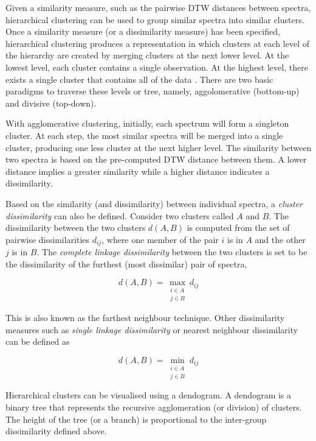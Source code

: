 Given a similarity measure, such as the pairwise DTW distances between spectra, hierarchical clustering can be used to group similar spectra into similar clusters. Once a similarity measure (or a dissimilarity measure) has been specified, hierarchical clustering produces a representation in which clusters at each level of the hierarchy are created by merging clusters at the next lower level. At the lowest level, each cluster contains a single observation. At the highest level, there exists a single cluster that contains all of the data \cite{hastie2009elements}. There are two basic paradigms to traverse these levels or tree, namely, aggolomerative (bottom-up) and divisive (top-down). 

With agglomerative clustering, initially, each spectrum will form a singleton cluster. At each step, the most similar spectra will be merged into a single cluster, producing one less cluster at the next higher level. The similarity between two spectra is based on the pre-computed DTW distance between them. A lower distance implies a greater similarity while a higher distance indicates a dissimilarity.  

Based on the similarity (and dissimilarity) between individual spectra, a \emph{cluster dissimilarity} can also be defined. Consider two clusters called $A$ and $B$. The dissimilarity between the two clusters $d(A,B)$ is computed from the set of pairwise dissimilarities $d_{ij}$, where one member of the pair $i$ is in $A$ and the other $j$ is in $B$. The \emph{complete linkage dissimilarity} between the two clusters is set to be the dissimilarity of the furthest (most dissimilar) pair of spectra,

\begin{equation}
    d(A,B) = \max_{\substack{i \in A \\ j \in B}} d_{ij}
\end{equation}

This is also known as the farthest neighbour technique. Other dissimilarity measures such as \emph{single linkage dissimilarity} or nearest neighbour dissimilarity can be defined as

\begin{equation}
    d(A,B) = \min_{\substack{i \in A \\ j \in B}} d_{ij}
\end{equation}

Hierarchical clusters can be visualised using a dendogram. A dendogram is a binary tree that represents the recursive agglomeration (or division) of clusters. The height of the tree (or a branch) is proportional to the inter-group dissimilarity defined above. 

